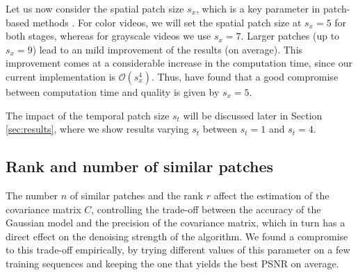 \documentclass[10pt, journal, twocolumn, final, a4paper]{IEEEtran}
\newcommand{\pcomment}[1]{}
\newcommand{\ma}[1]{\boldsymbol{#1}}
\begin{document}
Let us now consider the spatial patch
size $s_x$, which is a key parameter in patch-based methods \cite{Buades2006,Kervrann2006,Boulanger2007}.
%
For color videos, we will set the spatial patch size at $s_x = 5$ for both
stages, whereas for grayscale videos we use $s_x = 7$. Larger patches (up to $s_x = 9$) lead to an mild improvement of the
results (on average). This improvement comes at a considerable increase in the
computation time, since our current implementation is $\mathcal O(s_x^4)$.
Thus, have found that a good compromise between computation time and quality is
given by $s_x = 5$.

The impact of the temporal patch size $s_t$ will be discussed later in Section
\ref{sec:results}, where we show results varying $s_t$ between $s_t = 1$ and $s_t = 4$.

\subsection{Rank and number of similar patches}

The number $n$ of similar patches and the rank $r$ affect the estimation of the covariance
matrix $C$, controlling the trade-off between the accuracy of the Gaussian model
and the precision of the covariance matrix,
which in turn has a direct effect on the denoising strength of the algorithm.
We found a compromise to this trade-off empirically, by trying different values
of this parameter on a few training sequences and keeping the one that yields
the best PSNR on average.
\end{document}

